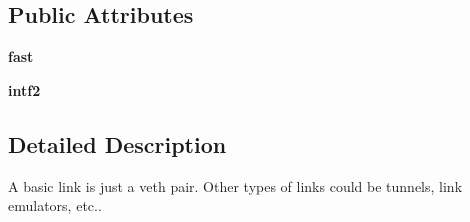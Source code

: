 \subsection*{Public Attributes}
\begin{DoxyCompactItemize}
\item 
\hypertarget{classmininet_1_1link_1_1Link_ae397dc83ab5fec22531b7f0ac7b8bcd8}{{\bfseries fast}}\label{classmininet_1_1link_1_1Link_ae397dc83ab5fec22531b7f0ac7b8bcd8}

\item 
\hypertarget{classmininet_1_1link_1_1Link_a8de28a90dbe9aab0fcca9fcb4d3b0bd8}{{\bfseries intf2}}\label{classmininet_1_1link_1_1Link_a8de28a90dbe9aab0fcca9fcb4d3b0bd8}

\end{DoxyCompactItemize}


\subsection{Detailed Description}
\begin{DoxyVerb}A basic link is just a veth pair.
   Other types of links could be tunnels, link emulators, etc..\end{DoxyVerb}
 

